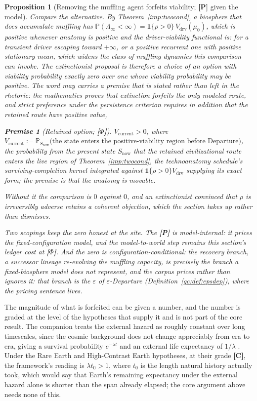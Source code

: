 \documentclass[11pt]{article}
\newcommand{\PP}{\mathbb{P}}
\newcommand{\one}{\mathbf{1}}
\theoremstyle{plain}
\newtheorem{proposition}[theorem]{Proposition}
\theoremstyle{definition}
\newtheorem{premise}{Premise}
\theoremstyle{remark}
\begin{document}
\begin{proposition}[Removing the muffling agent forfeits viability;
\textbf{[P]} given the model]
Compare the alternative. By Theorem~\ref{imp:twocond}, a biosphere
that does accumulate muffling has
$\PP(\Lambda_\infty<\infty)=\one\{\rho>0\}\,V_{\mathrm{drv}}(\mu_0)$,
which is positive whenever anatomy is positive and the driver-viability
functional is: for a transient driver escaping toward $+\infty$, or a
positive recurrent one with positive stationary mean, which
\emph{widens} the class of muffling dynamics this comparison can
invoke. The extinctionist proposal is therefore a choice of an option
with viability probability exactly zero over one whose viability
probability may be positive. The word \emph{may} carries a premise that
is stated rather than left in the rhetoric: the mathematics proves that
extinction forfeits the only modeled route, and strict preference under
the persistence criterion requires in addition that the retained route
have positive value,
\begin{premise}[Retained option; \textbf{[$\Phi$]}]\label{hr:prem:option}
$V_{\mathrm{current}}>0$, where
$V_{\mathrm{current}}:=\PP_{S_{\mathrm{now}}}\bigl(\text{the state enters
the positive-viability region before Departure}\bigr)$, the
probability from the present state $S_{\mathrm{now}}$ that the retained
civilizational route enters the live region of
Theorem~\ref{imp:twocond}, the technoanatomy schedule's
surviving-completion kernel integrated against $\one\{\rho>0\}V_{\mathrm{drv}}$
supplying its exact form; the premise is that the anatomy is movable.
\end{premise}
\noindent Without it the comparison is $0$ against $0$, and an
extinctionist convinced that $\rho$ is irreversibly adverse retains a
coherent objection, which the section takes up rather than dismisses.

Two scopings keep the zero honest at the site. The \textbf{[P]} is
model-internal: it prices the fixed-configuration model, and the
model-to-world step remains this section's ledger cost at
\textbf{[$\Phi$]}. And the zero is configuration-conditional: the
recovery branch, a successor lineage re-evolving the muffling
capacity, is precisely the branch a fixed-biosphere model does not
represent, and the corpus prices rather than ignores it: that branch
is the $\varepsilon$ of $\varepsilon$-Departure
(Definition~\ref{gc:def:epsdep}), where the pricing sentence lives.
\end{proposition}

The magnitude of what is forfeited can be given a number, and the
number is graded at the level of the hypotheses that supply it and is
not part of the core result. The companion treats the external hazard
as roughly constant over long timescales, since the cosmic background
does not change appreciably from era to era, giving a survival
probability $e^{-\lambda t}$ and an external life expectancy of
$1/\lambda$ \cite{Nexus}. Under the Rare Earth and High-Contrast Earth
hypotheses, at their grade \textbf{[C]}, the framework's reading is
$\lambda t_0>1$, where $t_0$ is the length natural history actually
took, which would say that Earth's remaining expectancy under the
external hazard alone is shorter than the span already elapsed; the
core argument above needs none of this.
\end{document}
